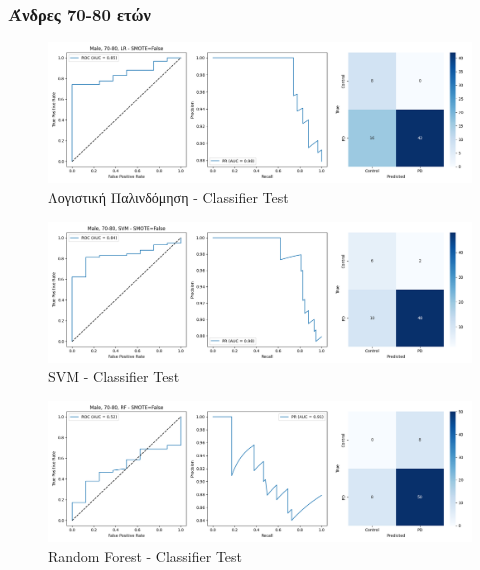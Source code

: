 \documentclass[12pt]{report}
\begin{document}
            \subsubsection*{Άνδρες 70-80 ετών}
                \vspace{-0.5cm}
                \begin{figure}[H]
                    \centering
                    \includegraphics[width=1\textwidth]{ML/Predict/DEG/AUC/results_stratified_Male_70-80_LR_useSMOTE_False.png}
                    \caption*{Λογιστική Παλινδόμηση - Classifier Test}
                    \label{fig:app_lr_males_70_80_test}
                \end{figure} 
                \begin{figure}[H]
                    \centering
                    \includegraphics[width=1\textwidth]{ML/Predict/DEG/AUC/results_stratified_Male_70-80_SVM_useSMOTE_False.png}
                    \caption*{SVM - Classifier Test}
                    \label{fig:app_svm_males_70_80_test}
                \end{figure}                 
                \begin{figure}[H]
                    \centering
                    \includegraphics[width=1\textwidth]{ML/Predict/DEG/AUC/results_stratified_Male_70-80_RF_useSMOTE_False.png}
                    \caption*{Random Forest - Classifier Test}
                    \label{fig:app_rf_males_70_80_test}
                \end{figure} 
\end{document}
